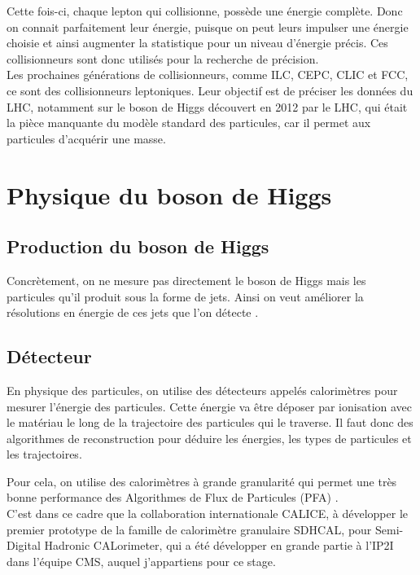 \documentclass[10pt,a4paper]{report}
\begin{document}
Cette fois-ci, chaque lepton qui collisionne, possède une énergie complète. Donc on connait parfaitement leur énergie, puisque on peut leurs impulser une énergie choisie et ainsi augmenter la statistique pour un niveau d'énergie précis.
Ces collisionneurs sont donc utilisés pour la recherche de précision.\\


Les prochaines générations de collisionneurs, comme ILC, CEPC, CLIC et FCC, ce sont des collisionneurs leptoniques. 
Leur objectif est de préciser les données du LHC, notamment sur le boson de Higgs découvert en 2012 par le LHC, qui était la pièce manquante du modèle standard des particules, car il permet aux particules d'acquérir une masse.

\section{Physique du boson de Higgs}

\subsection{Production du boson de Higgs}

Concrètement, on ne mesure pas directement le boson de Higgs mais les particules qu'il produit sous la forme de jets.
Ainsi on veut améliorer la résolutions en énergie de ces jets que l'on détecte \cite{liu:tel-03405418}.

\subsection{Détecteur}

En physique des particules, on utilise des détecteurs appelés calorimètres pour mesurer l'énergie des particules. 
Cette énergie va être déposer par ionisation avec le matériau le long de la trajectoire des particules qui le traverse. 
Il faut donc des algorithmes de reconstruction pour déduire les énergies, les types de particules et les trajectoires.

Pour cela, on utilise des calorimètres à grande granularité qui permet une très bonne performance des Algorithmes de Flux de Particules (PFA) \cite{liu:tel-03405418}. \\

C'est dans ce cadre que la collaboration internationale CALICE, à développer le premier prototype de la famille de calorimètre granulaire SDHCAL, pour Semi-Digital Hadronic CALorimeter, qui a été développer en grande partie à l'IP2I dans l'équipe CMS, auquel j'appartiens pour ce stage.
\end{document}
